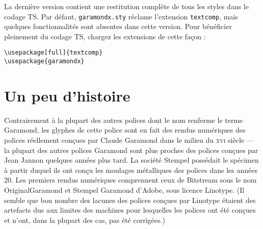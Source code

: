 \documentclass[12pt,english,french]{article}
\begin{document}
La dernière version contient une restitution complète de tous les styles dans le codage TS. Par défaut, \texttt{garamondx.sty} réclame l'extension \texttt{textcomp}, mais quelques fonctionnalités sont absentes dans cette version. Pour bénéficier pleinement du codage TS, chargez les extensions de cette façon :
\begin{verbatim}
\usepackage[full]{textcomp}
\usepackage{garamondx}
\end{verbatim}

\section{Un peu d'histoire}
Contrairement à la plupart des autres polices dont le nom renferme le terme Garamond, les glyphes de cette police sont en fait des rendus numériques des polices réellement conçues par Claude Garamond dans le milieu du \textsc{xvi} siècle --- la plupart des autres polices Garamond sont plus proches des polices conçues par Jean Jannon quelques années plus tard. La société Stempel possédait le spécimen à partir duquel ils ont conçu les moulages métalliques des polices dans les années 20. Les premiers rendus numériques comprennent ceux de Bitstream sous le nom OriginalGaramond et Stempel Garamond d'Adobe, sous licence Linotype. (Il semble que bon nombre des lacunes des polices conçues par Linotype étaient des artefacts dus aux limites des machines pour lesquelles les polices ont été conçues et n'ont, dans la plupart des cas, pas été corrigées.) 
\end{document}
